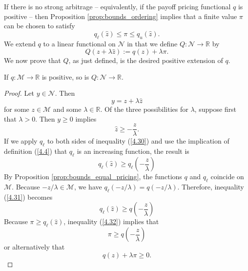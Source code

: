 \documentclass[\topdir/lecture\_notes.tex]{subfiles}
\begin{document}
\begin{optional}
If there is no strong arbitrage -- equivalently, if the payoff pricing functional $q$ is positive -- then Proposition \ref{prop:bounds_ordering} implies that a finite value $\pi$ can be chosen to satisfy
\begin{equation*}
q_{\ell}(\hat{z}) \leq \pi \leq q_{u}(\hat{z}) . 
\end{equation*}
We extend $q$ to a linear functional on $\mathcal{N}$ in that we define $Q: \mathcal{N} \rightarrow \mathbb{R}$ by
\begin{equation}
Q(z+\lambda \hat{z}) := q(z)+\lambda \pi . \label{4.28}
\end{equation}
We now prove that $Q$, as just defined, is the desired positive extension of $q$.

\begin{proposition} \label{prop:extension_positive}
If $q: \mathcal{M} \rightarrow \mathbb{R}$ is positive, so is $Q: \mathcal{N} \rightarrow \mathbb{R}$.
\end{proposition}
\begin{proof}
Let $y \in \mathcal{N}$. Then
\begin{equation*}
y=z+\lambda \hat{z} 
\end{equation*}
for some $z \in \mathcal{M}$ and some $\lambda \in \mathbb{R}$. Of the three possibilities for $\lambda$, suppose first that $\lambda>0$. Then $y \geq 0$ implies
\begin{equation}
\hat{z} \geq-\frac{z}{\lambda} . \label{4.30}
\end{equation}
If we apply $q_{\ell}$ to both sides of inequality (\ref{4.30}) and use the implication of definition (\ref{4.4}) that $q_{\ell}$ is an increasing function, the result is
\begin{equation}
q_{\ell}(\hat{z}) \geq q_{\ell}\left(-\frac{z}{\lambda}\right) \label{4.31}
\end{equation}
By Proposition \ref{prop:bounds_equal_pricing}, the functions $q$ and $q_{\ell}$ coincide on $\mathcal{M}$. Because $-z / \lambda \in \mathcal{M}$, we have $q_{\ell}(-z / \lambda)=q(-z / \lambda)$. Therefore, inequality (\ref{4.31}) becomes
\begin{equation}
q_{\ell}(\hat{z}) \geq q\left(-\frac{z}{\lambda}\right) \label{4.32}
\end{equation}
Because $\pi \geq q_{\ell}(\hat{z})$, inequality (\ref{4.32}) implies that
\begin{equation*}
\pi \geq q\left(-\frac{z}{\lambda}\right) 
\end{equation*}
or alternatively that
\begin{equation}
q(z)+\lambda \pi \geq 0 . \label{4.34}
\end{equation}


\end{proof}
\end{optional}
\end{document}
